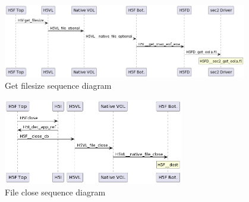 \begin{figure}
    \centering
    \includegraphics[width=0.95\textwidth]{images/tour2-file-get-filesize.png}
    \caption{Get filesize sequence diagram}
    \label{fig:tour2-file-get-filesize}
\end{figure}

\begin{figure}
    \centering
    \includegraphics[width=0.70\textwidth]{images/tour2-file-close.png}
    \caption{File close sequence diagram}
    \label{fig:tour2-file-close}
\end{figure}

